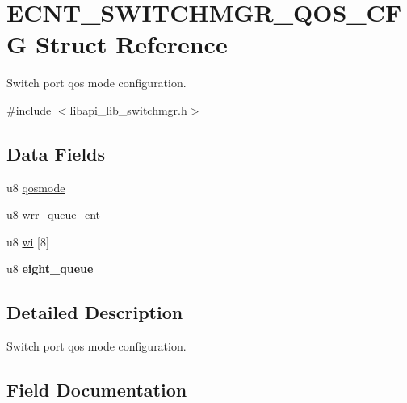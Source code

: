 \hypertarget{structECNT__SWITCHMGR__QOS__CFG}{}\section{E\+C\+N\+T\+\_\+\+S\+W\+I\+T\+C\+H\+M\+G\+R\+\_\+\+Q\+O\+S\+\_\+\+C\+FG Struct Reference}
\label{structECNT__SWITCHMGR__QOS__CFG}


Switch port qos mode configuration.  




{\ttfamily \#include $<$libapi\+\_\+lib\+\_\+switchmgr.\+h$>$}

\subsection*{Data Fields}
\begin{DoxyCompactItemize}
\item 
u8 \hyperlink{structECNT__SWITCHMGR__QOS__CFG_ac7b92b7fafe873aa8b1c378e4108672b}{qosmode}
\item 
u8 \hyperlink{structECNT__SWITCHMGR__QOS__CFG_a5b6569907da708d3e50ab33b296c4db4}{wrr\+\_\+queue\+\_\+cnt}
\item 
u8 \hyperlink{structECNT__SWITCHMGR__QOS__CFG_aeee5c49f5d01e424e39fdac58892fe9d}{wi} \mbox{[}8\mbox{]}
\item 
\mbox{\label{structECNT__SWITCHMGR__QOS__CFG_a32410a91b7d8f570adcaa0328556c525}} 
u8 {\bfseries eight\+\_\+queue}
\end{DoxyCompactItemize}


\subsection{Detailed Description}
Switch port qos mode configuration. 

\subsection{Field Documentation}
\mbox{\label{structECNT__SWITCHMGR__QOS__CFG_ac7b92b7fafe873aa8b1c378e4108672b}} 
